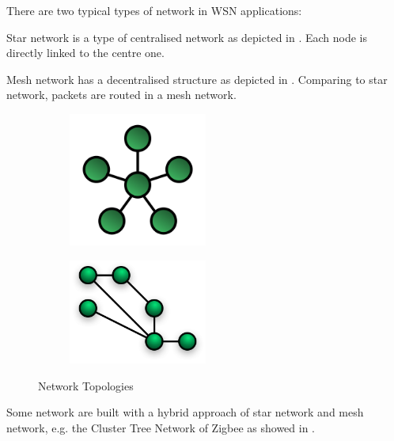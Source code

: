 There are two typical types of network in WSN applications:
\begin{description}[style=nextline]
	\item[\textbf{Star Network}]
	Star network is a type of centralised network as depicted in . Each node is directly linked to the centre one. 
	\item[\textbf{Mesh Network}]
	Mesh network has a decentralised structure as depicted in . Comparing to star network, packets are routed in a mesh network.
\end{description}
\begin{figure}
	\centering
	\begin{subfigure}[b]{0.5\textwidth}
		{
			\includegraphics[width=0.5\textwidth,]{fig/StarNetwork.png}
		}
		 \label{fig: Star Network}
	\end{subfigure}
	\begin{subfigure}[b]{0.5\textwidth}
		{
			\includegraphics[width=0.5\textwidth,]{fig/NetworkTopology-Mesh.png}
		}
		 \label{fig: Mesh Network}
	\end{subfigure}
	\caption{Network Topologies} \label{fig: Network topologies}
\end{figure}

Some network are built with a hybrid approach of star network and mesh network, e.g. the Cluster Tree Network of Zigbee\cite{Zigbee} as showed in .

